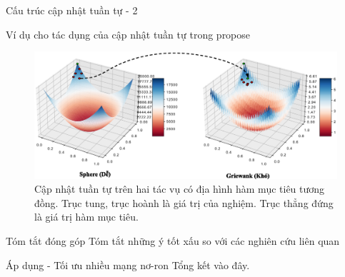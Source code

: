 \begin{frame}{Cấu trúc cập nhật tuần tự - 2}
    \begin{block}{Ví dụ cho tác dụng của cập nhật tuần tự trong \gls{propose}}
        \begin{figure}
            \centering
            \includegraphics[width=\linewidth]{figure/propose/sequential-motivation.eps}
            \caption{Cập nhật tuần tự trên hai tác vụ có địa hình hàm mục tiêu tương đồng. Trục tung, trục hoành là giá trị của nghiệm. Trục thẳng đứng là giá trị hàm mục tiêu.}
            \label{fig:propsoe:sequential-motivation}
        \end{figure}
    \end{block}
\end{frame}

\begin{frame}{Tóm tắt đóng góp}
    Tóm tắt những ý tốt xấu so với các nghiên cứu liên quan
\end{frame}

\begin{frame}{Áp dụng - Tối ưu nhiều mạng nơ-ron}
    Tổng kết vào đây.
\end{frame}

